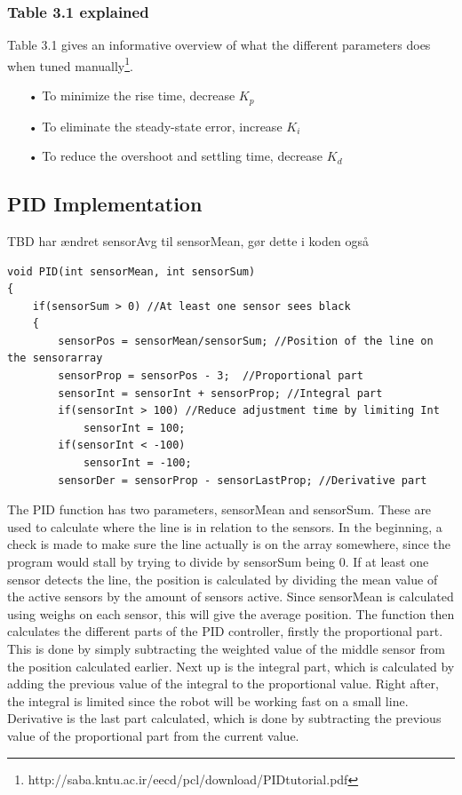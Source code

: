 \subsubsection {Table 3.1 explained}

Table 3.1 gives an informative overview of what the different parameters does when tuned manually\footnote{http://saba.kntu.ac.ir/eecd/pcl/download/PIDtutorial.pdf}.

\begin{enumerate}
		\item[•]To minimize the rise time, decrease $K_p$
		\item[•]To eliminate the steady-state error, increase $K_i$
		\item[•]To reduce the overshoot and settling time, decrease $K_d$
	\end{enumerate}
	
\subsection{PID Implementation}
TBD har ændret sensorAvg til sensorMean, gør dette i koden også
\begin{lstlisting}
void PID(int sensorMean, int sensorSum)
{
	if(sensorSum > 0) //At least one sensor sees black
	{
		sensorPos = sensorMean/sensorSum; //Position of the line on the sensorarray
		sensorProp = sensorPos - 3;  //Proportional part
		sensorInt = sensorInt + sensorProp; //Integral part
		if(sensorInt > 100) //Reduce adjustment time by limiting Int
			sensorInt = 100;  
		if(sensorInt < -100)
			sensorInt = -100;
		sensorDer = sensorProp - sensorLastProp; //Derivative part
\end{lstlisting}
The PID function has two parameters, sensorMean and sensorSum. These are used to calculate where the line is in relation to the sensors. In the beginning, a check is made to make sure the line actually is on the array somewhere, since the program would stall by trying to divide by sensorSum being 0. If at least one sensor detects the line, the position is calculated by dividing the mean value of the active sensors by the amount of sensors active. Since sensorMean is calculated using weighs on each sensor, this will give the average position. The function then calculates the different parts of the PID controller, firstly the proportional part. This is done by simply subtracting the weighted value of the middle sensor from the position calculated earlier. Next up is the integral part, which is calculated by adding the previous value of the integral to the proportional value. Right after, the integral is limited since the robot will be working fast on a small line. Derivative is the last part calculated, which is done by subtracting the previous value of the proportional part from the current value.

